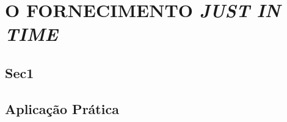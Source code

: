 \chapter{O FORNECIMENTO \textit{JUST IN TIME}}
\label{chap:fornecimento_just_in_time}


\section{Sec1}
\label{sec:fonercimento_just_in_time_sec1}




\section{Aplicação Prática}
\label{sec:fonercimento_just_in_time_aplicacao}
